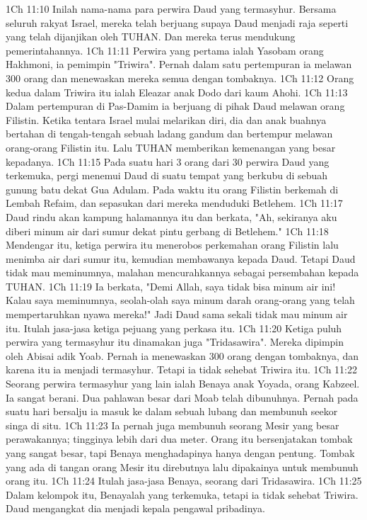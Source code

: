 1Ch 11:10  Inilah nama-nama para perwira Daud yang termasyhur. Bersama seluruh rakyat Israel, mereka telah berjuang supaya Daud menjadi raja seperti yang telah dijanjikan oleh TUHAN. Dan mereka terus mendukung pemerintahannya.
1Ch 11:11  Perwira yang pertama ialah Yasobam orang Hakhmoni, ia pemimpin "Triwira". Pernah dalam satu pertempuran ia melawan 300 orang dan menewaskan mereka semua dengan tombaknya.
1Ch 11:12  Orang kedua dalam Triwira itu ialah Eleazar anak Dodo dari kaum Ahohi.
1Ch 11:13  Dalam pertempuran di Pas-Damim ia berjuang di pihak Daud melawan orang Filistin. Ketika tentara Israel mulai melarikan diri, dia dan anak buahnya bertahan di tengah-tengah sebuah ladang gandum dan bertempur melawan orang-orang Filistin itu. Lalu TUHAN memberikan kemenangan yang besar kepadanya.
1Ch 11:15  Pada suatu hari 3 orang dari 30 perwira Daud yang terkemuka, pergi menemui Daud di suatu tempat yang berkubu di sebuah gunung batu dekat Gua Adulam. Pada waktu itu orang Filistin berkemah di Lembah Refaim, dan sepasukan dari mereka menduduki Betlehem.
1Ch 11:17  Daud rindu akan kampung halamannya itu dan berkata, "Ah, sekiranya aku diberi minum air dari sumur dekat pintu gerbang di Betlehem."
1Ch 11:18  Mendengar itu, ketiga perwira itu menerobos perkemahan orang Filistin lalu menimba air dari sumur itu, kemudian membawanya kepada Daud. Tetapi Daud tidak mau meminumnya, malahan mencurahkannya sebagai persembahan kepada TUHAN.
1Ch 11:19  Ia berkata, "Demi Allah, saya tidak bisa minum air ini! Kalau saya meminumnya, seolah-olah saya minum darah orang-orang yang telah mempertaruhkan nyawa mereka!" Jadi Daud sama sekali tidak mau minum air itu. Itulah jasa-jasa ketiga pejuang yang perkasa itu.
1Ch 11:20  Ketiga puluh perwira yang termasyhur itu dinamakan juga "Tridasawira". Mereka dipimpin oleh Abisai adik Yoab. Pernah ia menewaskan 300 orang dengan tombaknya, dan karena itu ia menjadi termasyhur. Tetapi ia tidak sehebat Triwira itu.
1Ch 11:22  Seorang perwira termasyhur yang lain ialah Benaya anak Yoyada, orang Kabzeel. Ia sangat berani. Dua pahlawan besar dari Moab telah dibunuhnya. Pernah pada suatu hari bersalju ia masuk ke dalam sebuah lubang dan membunuh seekor singa di situ.
1Ch 11:23  Ia pernah juga membunuh seorang Mesir yang besar perawakannya; tingginya lebih dari dua meter. Orang itu bersenjatakan tombak yang sangat besar, tapi Benaya menghadapinya hanya dengan pentung. Tombak yang ada di tangan orang Mesir itu direbutnya lalu dipakainya untuk membunuh orang itu.
1Ch 11:24  Itulah jasa-jasa Benaya, seorang dari Tridasawira.
1Ch 11:25  Dalam kelompok itu, Benayalah yang terkemuka, tetapi ia tidak sehebat Triwira. Daud mengangkat dia menjadi kepala pengawal pribadinya.
